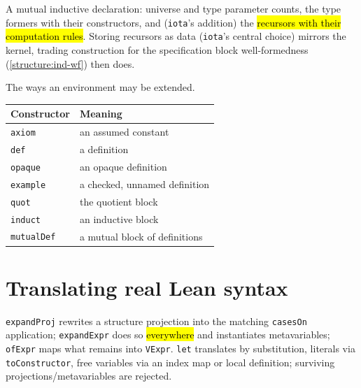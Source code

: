 \begin{definition}
\label{struct:vinductdecl}
\leanok
{} 

 A mutual inductive declaration: universe and type parameter counts, the
type formers with their constructors, and (\texttt{iota}'s addition) the \hl{recursors
with their computation rules}.
Storing recursors as data (\texttt{iota}'s central choice) mirrors the kernel,
trading construction for the specification block well-formedness
(\ref{structure:ind-wf}) then does.
\end{definition}

\begin{definition}
\label{ind:vdecl}
\leanok
{}

 The ways an environment may be extended.
\par\smallskip\noindent
\begin{tabular}{ll}
\toprule
Constructor & Meaning \\
\midrule
\texttt{axiom} & an assumed constant \\
\texttt{def} & a definition \\
\texttt{opaque} & an opaque definition \\
\texttt{example} & a checked, unnamed definition \\
\texttt{quot} & the quotient block \\
\texttt{induct} & an inductive block \\
\texttt{mutualDef} & a mutual block of definitions \\
\bottomrule
\end{tabular}\par\smallskip
\end{definition}

\section{Translating real Lean syntax}

\begin{definition}
\label{def:meta-ofexpr}
\leanok
{}

 \texttt{expandProj} rewrites a structure projection into the matching
\texttt{casesOn} application; \texttt{expandExpr} does so \hl{everywhere} and instantiates
metavariables; \texttt{ofExpr} maps what remains into \texttt{VExpr}.
\texttt{let} translates by substitution, literals via \texttt{toConstructor}, free
variables via an index map or local definition; surviving projections/metavariables are
rejected.
\end{definition}

